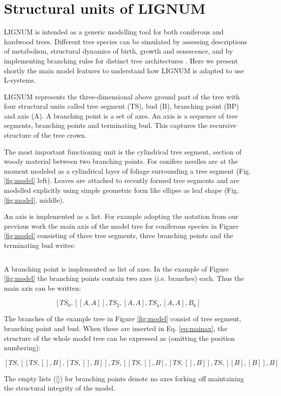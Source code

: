\section{Structural units of LIGNUM}
LIGNUM is intended as a generic modelling tool for both coniferous and
hardwood trees.  Different tree  species can be simulated by assessing
descriptions of  metabolism, structural dynamics of  birth, growth and
senescence,  and by  implementing  branching rules  for distinct  tree
architectures  \citep{perttunen:96,  perttunen:01}.   Here we  present
shortly the main model features to understand how LIGNUM is adapted to
use L-systems.

LIGNUM represents the three-dimensional  above ground part of the tree
with  four  structural  units  called  tree  segment  (TS),  bud  (B),
branching point  (BP) and  axis (A).   A branching point  is a  set of
axes. An  axis is  a sequence of  tree segments, branching  points and
terminating bud.   This captures the  recursive structure of  the tree
crown.

The most  important functioning unit is the  cylindrical tree segment,
section of woody material  between two branching points.  For conifers
needles are  at the moment modeled  as a cylindrical  layer of foliage
surrounding a  tree segment (Fig.  \ref{fig:model}  left).  Leaves are
attached to recently formed  tree segments and are modelled explicitly
using   simple   geometric   form   like   ellipse   as   leaf   shape
(Fig. \ref{fig:model}, middle).

An axis  is implemented as a  list. For example  adopting the notation
from our previous work \citep{perttunen:96} the main axis of the model
tree for  coniferous species  in Figure \ref{fig:model}  consisting of
three tree  segments, three branching  points and the  terminating bud
writes:

\begin{equation}
[TS_0,BP_1,TS_2,BP_3,TS_4,BP_5,B_6]
\end{equation}

A branching  point is implemented as  list of axes. In  the example of
Figure   \ref{fig:model}  the  branching   points  contain   two  axes
(i.e. branches) each. Thus the main axis can be written:

\begin{equation}\label{eq:mainax}
[TS_0,[[A,A]],TS_2,[A,A],TS_4,[A,A],B_6]
\end{equation}

The branches of the example  tree in Figure \ref{fig:model} consist of
tree  segment, branching  point and  bud. When  these are  inserted in
Eq. \ref{eq:mainax},  the structure  of  the whole  model  tree can  be
expressed as (omitting the position numbering):

\begin{equation}\label{eq:tree}
[TS,[[TS,[],B],[TS,[],B]],TS,[[TS,[],B],[TS,[],B]],TS,[[B],[B]],B]
\end{equation}

The empty lists  ([]) for branching points denote  no axes forking off
maintaining the structural integrity of the model.


